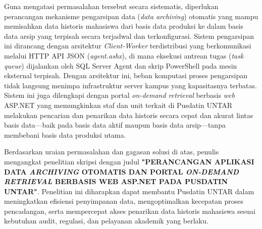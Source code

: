 Guna mengatasi permasalahan tersebut secara sistematis, diperlukan perancangan mekanisme pengarsipan data (\textit{data archiving}) otomatis yang mampu memisahkan data historis mahasiswa dari basis data produksi ke dalam basis data arsip yang terpisah secara terjadwal dan terkonfigurasi. Sistem pengarsipan ini dirancang dengan arsitektur \textit{Client-Worker} terdistribusi yang berkomunikasi melalui HTTP API JSON (\textit{agent.ashx}), di mana eksekusi antrean tugas (\textit{task queue}) dijalankan oleh SQL Server Agent dan skrip PowerShell pada mesin eksternal terpisah. Dengan arsitektur ini, beban komputasi proses pengarsipan tidak langsung menimpa infrastruktur server kampus yang kapasitasnya terbatas. Sistem ini juga dilengkapi dengan portal \textit{on-demand retrieval} berbasis \textit{web} ASP.NET yang memungkinkan staf dan unit terkait di Pusdatin UNTAR melakukan pencarian dan penarikan data historis secara cepat dan akurat lintas basis data---baik pada basis data aktif maupun basis data arsip---tanpa membebani basis data produksi utama.

Berdasarkan uraian permasalahan dan gagasan solusi di atas, penulis mengangkat penelitian skripsi dengan judul \textbf{"PERANCANGAN APLIKASI DATA \textit{ARCHIVING} OTOMATIS DAN PORTAL \textit{ON-DEMAND RETRIEVAL} BERBASIS WEB ASP.NET PADA PUSDATIN UNTAR"}. Penelitian ini diharapkan dapat membantu Pusdatin UNTAR dalam meningkatkan efisiensi penyimpanan data, mengoptimalkan kecepatan proses pencadangan, serta mempercepat akses penarikan data historis mahasiswa sesuai kebutuhan audit, regulasi, dan pelayanan akademik yang berlaku.
